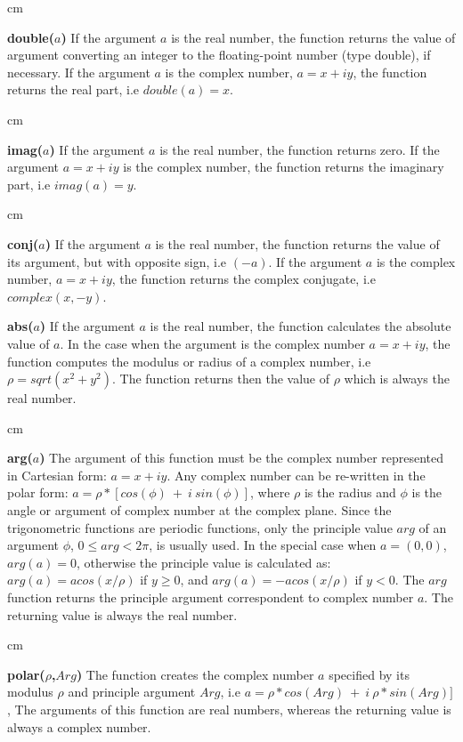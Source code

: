  cm

{\bf double($a$)}\hfil\break
If the argument $a$ is the real number,
the function returns the value of argument converting an
integer to the floating-point number (type double), if necessary.
If the argument $a$ is the complex number, $a=x+iy$,
the function returns the real part, i.e $double(a)=x$.

 cm

{\bf imag($a$)}\hfil\break
If the argument $a$ is the real number,
the function returns zero.
If the argument $a=x+iy$ is the complex number,
the function returns the imaginary part, i.e $imag(a)=y$.

 cm

{\bf conj($a$)}\hfil\break
If the argument $a$ is the real number,
the function returns the value of its argument, 
but with opposite sign, i.e $(-a)$.
If the argument $a$ is the complex number, $a=x+iy$,
the function returns the complex conjugate, 
i.e $complex(x,-y)$.
\newpage

{\bf abs($a$)}\hfil\break
If the argument $a$ is the real number,
the function calculates the absolute value of $a$. 
In the case when the argument is the complex number $a=x+iy$,
the function computes the modulus or radius of a complex number,
i.e $\rho = sqrt(x^2+y^2)$.
The function returns then the value of $\rho$
which is always the real number.

 cm

{\bf arg($a$)}\hfil\break
The argument of this function must be the complex number
represented in Cartesian form: $a=x+iy$.
Any complex number can be re-written in the polar form:
$a=\rho * [cos(\phi)\ +\ i\ sin(\phi)]$, 
where $\rho$ is the radius and $\phi$ is the angle or argument
of complex number at the complex plane.
Since the trigonometric functions are periodic functions,
only the principle value $arg$ of an argument $\phi$, 
$0 \le arg < 2\pi$, is usually used.
In the special case when $a=(0,0)$, $arg(a)=0$, otherwise
the principle value is calculated as: $arg(a) = acos(x/\rho)$ if $y \ge 0$,
and $arg(a) = -acos(x/\rho)$ if $y<0$.
The $arg$ function returns the principle argument
correspondent to complex number $a$.
The returning value is always the real number.

 cm

{\bf polar($\rho$,$Arg$)}\hfil\break
The function creates the complex number $a$ specified by its
modulus $\rho$ and principle argument $Arg$, i.e
$a=\rho*cos(Arg)\ +\ i\ \rho*sin(Arg)]$, 
The arguments of this function are real numbers,
whereas the returning value is always a complex number.
\newpage


